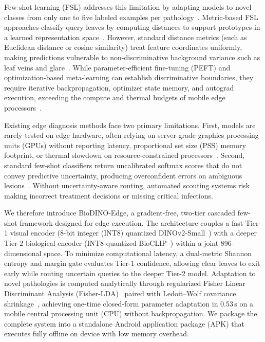 \documentclass[preprint,12pt]{elsarticle}
\begin{document}
Few-shot learning (FSL) addresses this limitation by adapting models to novel classes from only one to five labeled examples per pathology~\cite{sun2024few}. Metric-based FSL approaches classify query leaves by computing distances to support prototypes in a learned representation space~\cite{zhao2024mafde}. However, standard distance metrics (such as Euclidean distance or cosine similarity) treat feature coordinates uniformly, making predictions vulnerable to non-discriminative background variance such as leaf veins and glare~\cite{yang2024laboratory,kudo2025few}. While parameter-efficient fine-tuning (PEFT) and optimization-based meta-learning can establish discriminative boundaries, they require iterative backpropagation, optimizer state memory, and autograd execution, exceeding the compute and thermal budgets of mobile edge processors~\cite{babu2025agrifewnet}.

Existing edge diagnosis methods face two primary limitations. First, models are rarely tested on edge hardware, often relying on server-grade graphics processing units (GPUs) without reporting latency, proportional set size (PSS) memory footprint, or thermal slowdown on resource-constrained processors~\cite{radocaj2025evolution}. Second, standard few-shot classifiers return uncalibrated softmax scores that do not convey predictive uncertainty, producing overconfident errors on ambiguous lesions~\cite{sharif2026real}. Without uncertainty-aware routing, automated scouting systems risk making incorrect treatment decisions or missing critical infections.

We therefore introduce BioDINO-Edge, a gradient-free, two-tier cascaded few-shot framework designed for edge execution. The architecture couples a fast Tier-1 visual encoder (8-bit integer (INT8) quantized DINOv2-Small~\cite{oquab2023dinov2}) with a deeper Tier-2 biological encoder (INT8-quantized BioCLIP~\cite{stevens2024bioclip}) within a joint 896-dimensional space. To minimize computational latency, a dual-metric Shannon entropy and margin gate evaluates Tier-1 confidence, allowing clear leaves to exit early while routing uncertain queries to the deeper Tier-2 model. Adaptation to novel pathologies is computed analytically through regularized Fisher Linear Discriminant Analysis (Fisher-LDA)~\cite{fisher1936use} paired with Ledoit--Wolf covariance shrinkage~\cite{ledoit2004well}, achieving one-time closed-form parameter adaptation in 0.53\,s on a mobile central processing unit (CPU) without backpropagation. We package the complete system into a standalone Android application package (APK) that executes fully offline on device with low memory overhead.
\end{document}
